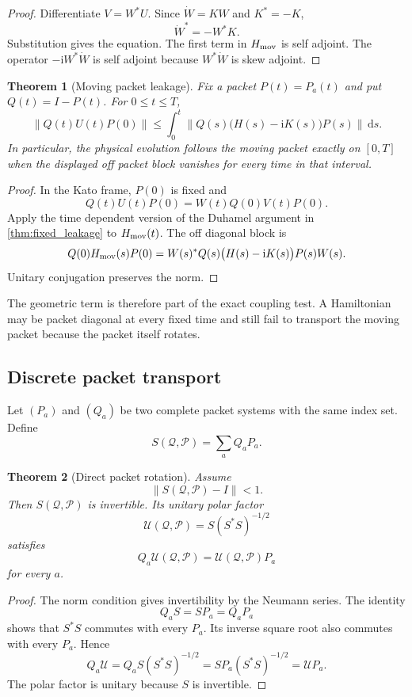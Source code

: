 \documentclass{aomart}
\newtheorem{theorem}{Theorem}[section]
\theoremstyle{definition}
\theoremstyle{remark}
\newcommand{\Pcal}{\mathcal P}
\newcommand{\Qcal}{\mathcal Q}
\newcommand{\Ucal}{\mathcal U}
\newcommand{\ii}{\mathrm i}
\newcommand{\dd}{\,\mathrm d}
\newcommand{\norm}[1]{\left\lVert#1\right\rVert}
\begin{document}
\begin{proof}
Differentiate \(V=W^*U\). Since \(\dot W=KW\) and \(K^*=-K\),
\[
\dot W^*=-W^*K.
\]
Substitution gives the equation. The first term in \(H_{\rm mov}\) is self adjoint. The operator \(-\ii W^*\dot W\) is self adjoint because \(W^*\dot W\) is skew adjoint.
\end{proof}

\begin{theorem}[Moving packet leakage]\label{thm:moving_leakage}
Fix a packet \(P(t)=P_a(t)\) and put \(Q(t)=I-P(t)\). For \(0\leq t\leq T\),
\[
\norm{Q(t)U(t)P(0)}
\leq
\int_0^t
\norm{Q(s)\bigl(H(s)-\ii K(s)\bigr)P(s)}
\dd s.
\]
In particular, the physical evolution follows the moving packet exactly on \([0,T]\) when the displayed off packet block vanishes for every time in that interval.
\end{theorem}

\begin{proof}
In the Kato frame, \(P(0)\) is fixed and
\[
Q(t)U(t)P(0)
=
W(t)Q(0)V(t)P(0).
\]
Apply the time dependent version of the Duhamel argument in \cref{thm:fixed_leakage} to \(H_{\rm mov}(t)\). The off diagonal block is
\[
Q(0)H_{\rm mov}(s)P(0)
=
W(s)^*Q(s)\bigl(H(s)-\ii K(s)\bigr)P(s)W(s).
\]
Unitary conjugation preserves the norm.
\end{proof}

The geometric term is therefore part of the exact coupling test. A Hamiltonian may be packet diagonal at every fixed time and still fail to transport the moving packet because the packet itself rotates.

\subsection{Discrete packet transport}\label{subsec:discrete_transport}

Let \((P_a)\) and \((Q_a)\) be two complete packet systems with the same index set. Define
\[
S(\Qcal,\Pcal)=\sum_aQ_aP_a.
\]

\begin{theorem}[Direct packet rotation]\label{thm:direct_rotation}
Assume
\[
\norm{S(\Qcal,\Pcal)-I}<1.
\]
Then \(S(\Qcal,\Pcal)\) is invertible. Its unitary polar factor
\[
\Ucal(\Qcal,\Pcal)
=
S(S^*S)^{-1/2}
\]
satisfies
\[
Q_a\Ucal(\Qcal,\Pcal)
=
\Ucal(\Qcal,\Pcal)P_a
\]
for every \(a\).
\end{theorem}

\begin{proof}
The norm condition gives invertibility by the Neumann series. The identity
\[
Q_aS=SP_a=Q_aP_a
\]
shows that \(S^*S\) commutes with every \(P_a\). Its inverse square root also commutes with every \(P_a\). Hence
\[
Q_a\Ucal
=Q_aS(S^*S)^{-1/2}
=SP_a(S^*S)^{-1/2}
=\Ucal P_a.
\]
The polar factor is unitary because \(S\) is invertible.
\end{proof}
\end{document}
